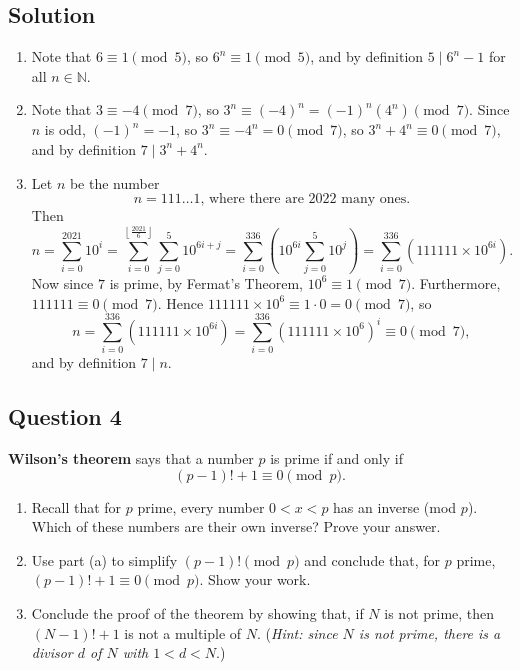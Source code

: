 \documentclass{article}
\begin{document}
\subsection*{Solution}
    \begin{enumerate}
        \item Note that $6 \equiv 1 \pmod{5}$, so $6^{n} \equiv 1 \pmod{5}$, and by definition $5 \mid 6^{n} - 1$ for all $n \in \mathbb{N}$.
        \item Note that $3 \equiv -4 \pmod{7}$, so $3^{n} \equiv (-4)^{n} = (-1)^{n}(4^{n}) \pmod{7}$. Since $n$ is odd, $(-1)^{n} = -1$, so $3^{n} \equiv -4^{n} = 0 \pmod{7}$, so $3^{n} + 4^{n} \equiv 0 \pmod{7}$, and by definition $7 \mid 3^{n} + 4^{n}$.
        \item Let $n$ be the number $$n = 111\dots 1\text{, where there are 2022 many ones}.$$ Then $$n = \sum_{i = 0}^{2021} 10^{i} = \sum_{i = 0}^{\left\lfloor \frac{2021}{6} \right\rfloor} \sum_{j = 0}^{5} 10^{6i + j} = \sum_{i = 0}^{336} \left(10^{6i} \sum_{j = 0}^{5} 10^{j}\right) = \sum_{i = 0}^{336} (111111 \times 10^{6i}).$$ Now since $7$ is prime, by Fermat's Theorem, $10^{6} \equiv 1 \pmod{7}$. Furthermore, $111111 \equiv 0 \pmod{7}$. Hence $111111 \times 10^{6} \equiv 1 \cdot 0 = 0 \pmod{7}$, so $$n = \sum_{i = 0}^{336} (111111 \times 10^{6i}) = \sum_{i = 0}^{336} (111111 \times 10^{6})^{i} \equiv 0 \pmod{7},$$ and by definition $7 \mid n$.
    \end{enumerate}

\subsection*{Question 4}
    \textbf{Wilson's theorem} says that a number $p$ is prime if and only if $$(p - 1)! + 1 \equiv 0 \pmod{p}.$$
    \begin{enumerate}
        \item Recall that for $p$ prime, every number $0 < x < p$ has an inverse (mod $p$). Which of these numbers are their own inverse? Prove your answer.
        \item Use part (a) to simplify $(p - 1)! \pmod{p}$ and conclude that, for $p$ prime, $(p - 1)! + 1 \equiv 0 \pmod{p}$. Show your work.
        \item Conclude the proof of the theorem by showing that, if $N$ is not prime, then $(N - 1)! + 1$ is not a multiple of $N$. (\textit{Hint: since $N$ is not prime, there is a divisor $d$ of $N$ with $1 < d < N$}.)
    \end{enumerate}
    
\end{document}
